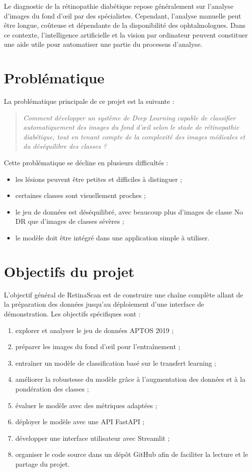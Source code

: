 \documentclass[12pt,a4paper]{report}
\begin{document}
Le diagnostic de la rétinopathie diabétique repose généralement sur l'analyse d'images du fond d'œil par des spécialistes. Cependant, l'analyse manuelle peut être longue, coûteuse et dépendante de la disponibilité des ophtalmologues. Dans ce contexte, l'intelligence artificielle et la vision par ordinateur peuvent constituer une aide utile pour automatiser une partie du processus d'analyse.

\section{Problématique}
La problématique principale de ce projet est la suivante :

\begin{quote}
\textit{Comment développer un système de Deep Learning capable de classifier automatiquement des images du fond d'œil selon le stade de rétinopathie diabétique, tout en tenant compte de la complexité des images médicales et du déséquilibre des classes ?}
\end{quote}

Cette problématique se décline en plusieurs difficultés :
\begin{itemize}
    \item les lésions peuvent être petites et difficiles à distinguer ;
    \item certaines classes sont visuellement proches ;
    \item le jeu de données est déséquilibré, avec beaucoup plus d'images de classe No DR que d'images de classes sévères ;
    \item le modèle doit être intégré dans une application simple à utiliser.
\end{itemize}

\section{Objectifs du projet}
L'objectif général de RetinaScan est de construire une chaîne complète allant de la préparation des données jusqu'au déploiement d'une interface de démonstration. Les objectifs spécifiques sont :
\begin{enumerate}
    \item explorer et analyser le jeu de données APTOS 2019 ;
    \item préparer les images du fond d'œil pour l'entraînement ;
    \item entraîner un modèle de classification basé sur le transfert learning ;
    \item améliorer la robustesse du modèle grâce à l'augmentation des données et à la pondération des classes ;
    \item évaluer le modèle avec des métriques adaptées ;
    \item déployer le modèle avec une API FastAPI ;
    \item développer une interface utilisateur avec Streamlit ;
    \item organiser le code source dans un dépôt GitHub afin de faciliter la lecture et le partage du projet.
\end{enumerate}
\end{document}
